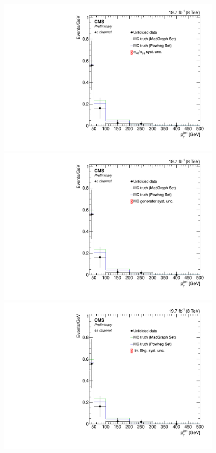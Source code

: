\begin{figure}[hbtp]
 \begin{center}
   \includegraphics[width=0.8\cmsFigWidth]{Figures/Unfolding/Systematics/ZZTo4e_PtJet1_qqgg_Mad_fr}     
   \includegraphics[width=0.8\cmsFigWidth]{Figures/Unfolding/Systematics/ZZTo4e_PtJet1_MCgen_Mad_fr}     
   \includegraphics[width=0.8\cmsFigWidth]{Figures/Unfolding/Systematics/ZZTo4e_PtJet1_IrrBkg_Mad_fr}

\end{center}
\end{figure}
